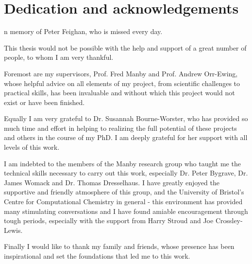 %
%

\chapter*{Dedication and acknowledgements}
\begin{SingleSpace}
n memory of Peter Feighan, who is missed every day.

\hfill \break
\hfill \break
\hfill \break

This thesis would not be possible with the help and support of a great number of
people, to whom I am very thankful.

\hfill \break

Foremost are my supervisors, Prof. Fred Manby and Prof. Andrew Orr-Ewing, whose
helpful advice on all elements of my project, from scientific challenges to practical
skills, has been invaluable and without which this project would not exist or have 
been finished.

\hfill \break

Equally I am very grateful to Dr. Susannah Bourne-Worster, who has provided so
much time and effort in helping to realizing the full potential of these projects
and others in the course of my PhD. I am deeply grateful for her support with all 
levels of this work.

\hfill \break

I am indebted to the members of the Manby research group who taught me the technical
skills necessary to carry out this work, especially Dr. Peter Bygrave, Dr. James
Womack and Dr. Thomas Dresselhaus. I have greatly enjoyed the supportive and friendly
atmosphere of this group, and the University of Bristol's Centre for Computational 
Chemistry in general - this environment has provided many stimulating conversations 
and I have found amiable encouragement through tough periods, especially with the 
support from Harry Stroud and Joe Crossley-Lewis.

\hfill \break

Finally I would like to thank my family and friends, whose presence has been inspirational
and set the foundations that led me to this work.

\end{SingleSpace}
\clearpage